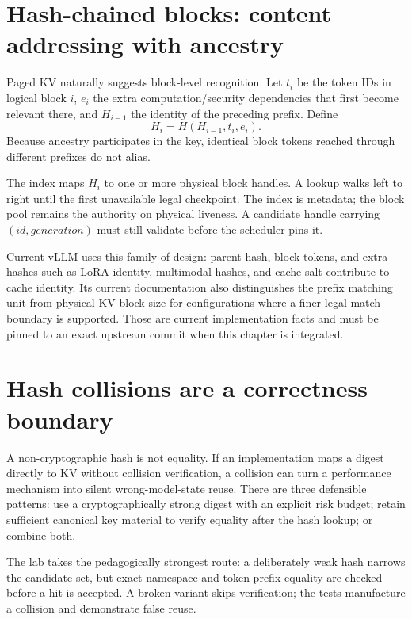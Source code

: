 \section{Hash-chained blocks: content addressing with ancestry}

Paged KV naturally suggests block-level recognition. Let $t_i$ be the token IDs in
logical block $i$, $e_i$ the extra computation/security dependencies that first
become relevant there, and $H_{i-1}$ the identity of the preceding prefix. Define
\begin{equation}
H_i = H(H_{i-1}, t_i, e_i).
\label{eq:hash-chain}
\end{equation}
Because ancestry participates in the key, identical block tokens reached through
different prefixes do not alias.

The index maps $H_i$ to one or more physical block handles. A lookup walks left to
right until the first unavailable legal checkpoint. The index is metadata; the block
pool remains the authority on physical liveness. A candidate handle carrying
$(id,generation)$ must still validate before the scheduler pins it.

Current vLLM uses this family of design: parent hash, block tokens, and extra hashes
such as LoRA identity, multimodal hashes, and cache salt contribute to cache identity.
Its current documentation also distinguishes the prefix matching unit from physical
KV block size for configurations where a finer legal match boundary is supported.
Those are current implementation facts and must be pinned to an exact upstream commit
when this chapter is integrated.

\section{Hash collisions are a correctness boundary}

A non-cryptographic hash is not equality. If an implementation maps a digest directly
to KV without collision verification, a collision can turn a performance mechanism
into silent wrong-model-state reuse. There are three defensible patterns: use a
cryptographically strong digest with an explicit risk budget; retain sufficient
canonical key material to verify equality after the hash lookup; or combine both.

The lab takes the pedagogically strongest route: a deliberately weak hash narrows the
candidate set, but exact namespace and token-prefix equality are checked before a hit
is accepted. A broken variant skips verification; the tests manufacture a collision
and demonstrate false reuse.

